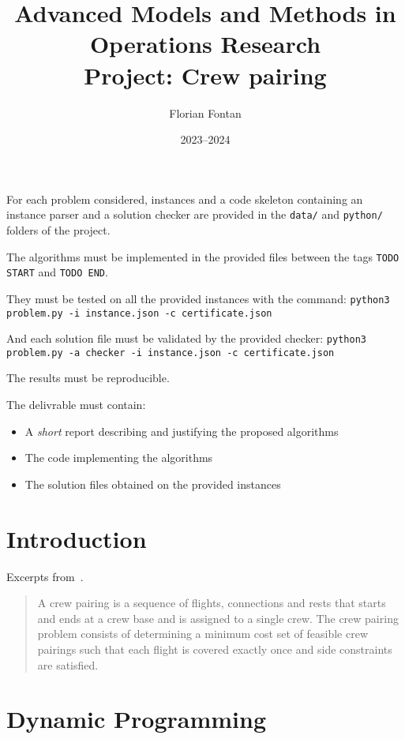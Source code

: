 \documentclass[a4paper,twocolumn]{article}
\author{Florian Fontan}
\title{Advanced Models and Methods in Operations Research \\ Project: Crew pairing}
\date{2023--2024}
\begin{document}
\maketitle

For each problem considered, instances and a code skeleton containing an instance parser and a solution checker are provided in the \texttt{data/} and \texttt{python/} folders of the project.

The algorithms must be implemented in the provided files between the tags \texttt{TODO START} and \texttt{TODO END}.

They must be tested on all the provided instances with the command:
\texttt{python3 problem.py -i instance.json -c certificate.json}

And each solution file must be validated by the provided checker:
\texttt{python3 problem.py -a checker -i instance.json -c certificate.json}

The results must be reproducible.

\bigskip

The delivrable must contain:
\begin{itemize}
  \item A \emph{short} report describing and justifying the proposed algorithms
  \item The code implementing the algorithms
  \item The solution files obtained on the provided instances
\end{itemize}

\section*{Introduction}

Excerpts from~\cite{saddoune_aircrew_2013}.

\begin{quotation}
  A crew pairing is a sequence of flights, connections and rests that starts and ends at a crew base and is assigned to a single crew. The crew pairing problem consists of determining a minimum cost set of feasible crew pairings such that each flight is covered exactly once and side constraints are satisfied.
\end{quotation}

\section{Dynamic Programming}
\end{document}
